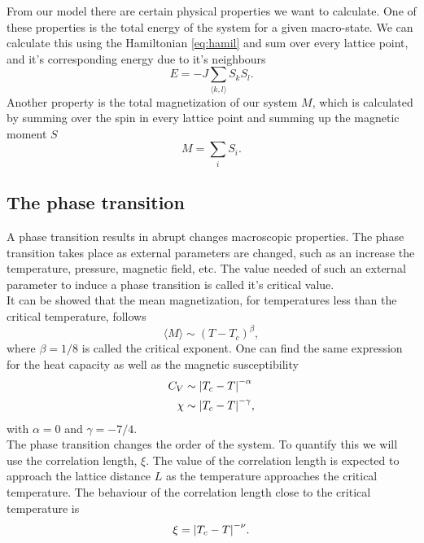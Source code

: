 \documentclass[%
 reprint,
nofootinbib,
aps,
]{revtex4-1}
\begin{document}
From our model there are certain physical properties we want to calculate. One of these properties is the total energy of the system for a given macro-state. We can calculate this using the Hamiltonian \eqref{eq:hamil} and sum over every lattice point, and it's corresponding energy due to it's neighbours
\begin{equation}
    E = -J\sum_{\langle k, l \rangle} S_kS_l. \label{eq:energy}
\end{equation}
Another property is the total magnetization of our system $M$, which is calculated by summing over the spin in every lattice point and summing up the magnetic moment $S$
\begin{equation}
    M = \sum_{i}S_i.
\end{equation}

\subsection{The phase transition}
A phase transition results in abrupt changes macroscopic properties. The phase transition takes place as external parameters are changed, such as an increase the temperature, pressure, magnetic field, etc. The value needed of such an external parameter to induce a phase transition is called it's critical value.\\
It can be showed that the mean magnetization, for temperatures less than the critical temperature, follows
\begin{equation}
    \langle M \rangle \sim \left(T-T_c\right)^{\beta},
\end{equation}
where $\beta=1/8$ is called the critical exponent. One can find the same expression for the heat capacity as well as the magnetic susceptibility
\begin{align}
    C_V &\sim \abs{T_c-T}^{-\alpha} \label{CVALPHA}\\
    \chi &\sim \abs{T_c-T}^{-\gamma}, \label{CHIGAMMA}
\end{align}
with $\alpha = 0$ and $\gamma = -7/4$.\\
The phase transition changes the order of the system. To quantify this we will use the correlation length, $\xi$. The value of the correlation length is expected to approach the lattice distance $L$ as the temperature approaches the critical temperature. The behaviour of the correlation length close to the critical temperature is
\begin{equation}
    \xi = \abs{T_c-T}^{-\nu}.
\end{equation}
\end{document}
